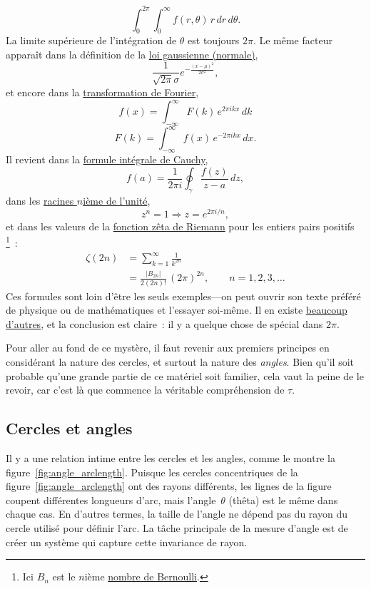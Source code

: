 \[
  \int_0^{2\pi}\int_0^\infty f(r, \theta)\, r\, dr\, d\theta.
\]
La limite supérieure de l'intégration de $\theta$ est toujours $2\pi$. Le même facteur apparaît dans la définition de la \href{https://fr.wikipedia.org/wiki/Loi_normale}{loi gaussienne (normale)},
\[
  \frac{1}{\sqrt{2\pi}\sigma}e^{-\frac{(x-\mu)^2}{2\sigma^2}},
\]
et encore dans la \href{https://fr.wikipedia.org/wiki/Transformation_de_Fourier}{transformation de Fourier},
\[
  f(x) = \int_{-\infty}^\infty F(k)\, e^{2\pi ikx}\,dk
\]
\[
    F(k) = \int_{-\infty}^\infty f(x)\, e^{-2\pi ikx}\,dx.
\]
Il revient dans la \href{https://fr.wikipedia.org/wiki/Formule_intégrale_de_Cauchy}{formule intégrale de Cauchy},
\[
  f(a) = \frac{1}{2\pi i}\oint_\gamma\frac{f(z)}{z-a}\,dz,
\]
dans les \href{https://fr.wikipedia.org/wiki/Racine_de_l%27unité}{racines $n$ième de l'unité},
\[
  z^n = 1 \Rightarrow z = e^{2\pi i/n},
\]
et dans les valeurs de la \href{https://fr.wikipedia.org/wiki/Fonction_zêta_de_Riemann}{fonction zêta de Riemann} pour les entiers pairs positifs\,\footnote{Ici $B_n$ est le $n$ième \href{https://fr.wikipedia.org/wiki/Nombre_de_Bernoulli}{nombre de Bernoulli}.}~:
\[
\begin{split}
  \zeta(2n) & = \sum_{k=1}^\infty \frac{1}{k^{2n}} \\
            & = \frac{|B_{2n}|}{2(2n)!}\,(2\pi)^{2n},\qquad n = 1, 2, 3, \ldots
\end{split}
\]
Ces formules sont loin d'être les seuls exemples---on peut ouvrir son texte préféré de physique ou de mathématiques et l'essayer soi-même. Il en existe \href{http://www.harremoes.dk/Peter/Undervis/Turnpage/Turnpage1.html}{beaucoup d'autres}, et la conclusion est claire~: il y a quelque chose de spécial dans $2\pi$.

Pour aller au fond de ce mystère, il faut revenir aux premiers principes en considérant la nature des cercles, et surtout la nature des \emph{angles}. Bien qu'il soit probable qu'une grande partie de ce matériel soit familier, cela vaut la peine de le revoir, car c'est là que commence la véritable compréhension de $\tau$.

  \subsection{Cercles et angles} %
  \label{sec:circles_and_angles}

Il y a une relation intime entre les cercles et les angles, comme le montre la figure~\ref{fig:angle_arclength}. Puisque les cercles concentriques de la figure~\ref{fig:angle_arclength} ont des rayons différents, les lignes de la figure coupent différentes longueurs d'arc, mais l'angle~$\theta$ (thêta) est le même dans chaque cas. En d'autres termes, la taille de l'angle ne dépend pas du rayon du cercle utilisé pour définir l'arc. La tâche principale de la mesure d'angle est de créer un système qui capture cette invariance de rayon.


